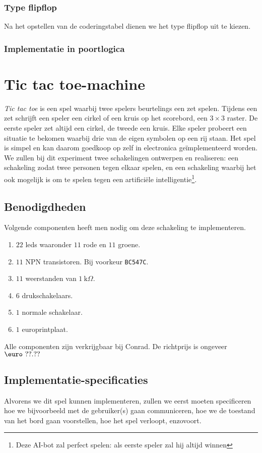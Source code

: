 \subsubsection{Type flipflop}
Na het opstellen van de coderingstabel dienen we het type flipflop uit te kiezen.
\subsubsection{Implementatie in poortlogica}

\section{Tic tac toe-machine}
\emph{Tic tac toe} is een spel waarbij twee spelers beurtelings een zet spelen. Tijdens een zet schrijft een speler een cirkel of een kruis op het scorebord, een $3\times 3$ raster. De eerste speler zet altijd een cirkel, de tweede een kruis. Elke speler probeert een situatie te bekomen waarbij drie van de eigen symbolen op een rij staan. Het spel is simpel en kan daarom goedkoop op zelf in electronica ge\"implementeerd worden. We zullen bij dit experiment twee schakelingen ontwerpen en realiseren: een schakeling zodat twee personen tegen elkaar spelen, en een schakeling waarbij het ook mogelijk is om te spelen tegen een artifici\"ele intelligentie\footnote{Deze AI-bot zal perfect spelen: als eerste speler zal hij altijd winnen}.
\subsection{Benodigdheden}
Volgende componenten heeft men nodig om deze schakeling te implementeren.
\begin{enumerate}
 \item $22$ leds waaronder $11$ rode en $11$ groene.
 \item $11$ NPN transistoren. Bij voorkeur \verb+BC547C+.
 \item $11$ weerstanden van $1~\mbox{k}\Omega$.
 \item $6$ drukschakelaars.
 \item $1$ normale schakelaar.
 \item $1$ europrintplaat.
\end{enumerate}
Alle componenten zijn verkrijgbaar bij Conrad. De richtprijs is ongeveer $\mbox{\euro}\ ??.??$
\subsection{Implementatie-specificaties}
Alvorens we dit spel kunnen implementeren, zullen we eerst moeten specificeren hoe we bijvoorbeeld met de gebruiker(s) gaan communiceren, hoe we de toestand van het bord gaan voorstellen, hoe het spel verloopt, enzovoort.
